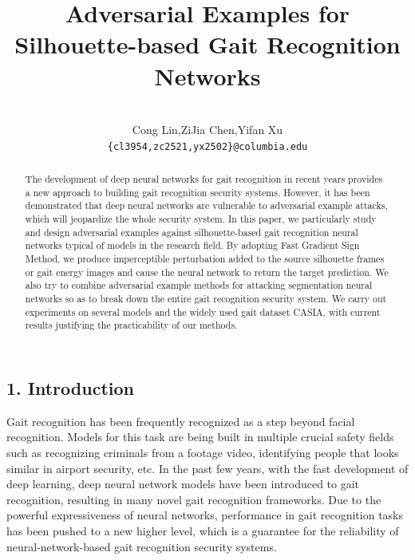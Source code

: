 \documentclass[letterpaper]{article} %
\title{Adversarial Examples for Silhouette-based Gait Recognition Networks}
\author{\\Cong Lin,\quad ZiJia Chen,\quad Yifan Xu\\  \texttt{\{cl3954,zc2521,yx2502\}@columbia.edu}}
\begin{document}
\maketitle

\begin{abstract}
The development of deep neural networks for gait recognition in recent years provides a new approach to building gait recognition security systems. However, it has been demonstrated that deep neural networks are vulnerable to adversarial example attacks, which will jeopardize the whole security system. In this paper, we particularly study and design adversarial examples against silhouette-based gait recognition neural networks typical of models in the research field. By adopting Fast Gradient Sign Method, we produce imperceptible perturbation added to the source silhouette frames or gait energy images and cause the neural network to return the target prediction. We also try to combine adversarial example methods for attacking segmentation neural networks so as to break down the entire gait recognition security system. We carry out experiments on several models and the widely used gait dataset CASIA, with current results justifying the practicability of our methods.

\end{abstract}

\subsection{1. Introduction}
Gait recognition has been frequently recognized as a step beyond facial recognition. Models for this task are being built in multiple crucial safety fields such as recognizing criminals from a footage video, identifying people that looks similar in airport security, etc. In the past few years, with the fast development of deep learning, deep neural network models have been introduced to gait recognition, resulting in many novel gait recognition frameworks. Due to the powerful expressiveness of neural networks, performance in gait recognition tasks has been pushed to a new higher level, which is a guarantee for the reliability of neural-network-based gait recognition security systems.
\end{document}

